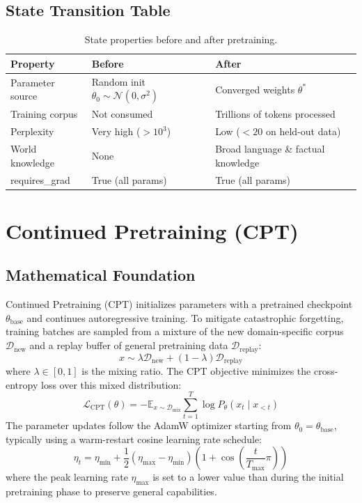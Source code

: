 \subsection{State Transition Table}
\begin{table}[h]\centering
\begin{tabular}{lll}\toprule
\textbf{Property} & \textbf{Before} & \textbf{After}\\\midrule
Parameter source & Random init $\theta_0 \sim \mathcal{N}(0,\sigma^2)$ & Converged weights $\theta^*$\\
Training corpus & Not consumed & Trillions of tokens processed\\
Perplexity & Very high ($>10^3$) & Low ($<20$ on held-out data)\\
World knowledge & None & Broad language \& factual knowledge\\
requires\_grad & True (all params) & True (all params)\\\bottomrule
\end{tabular}
\caption{State properties before and after pretraining.}
\end{table}

\newpage
\section{Continued Pretraining (CPT)}

\subsection{Mathematical Foundation}
Continued Pretraining (CPT) initializes parameters with a pretrained checkpoint $\theta_{\text{base}}$ and continues autoregressive training. To mitigate catastrophic forgetting, training batches are sampled from a mixture of the new domain-specific corpus $\mathcal{D}_{\text{new}}$ and a replay buffer of general pretraining data $\mathcal{D}_{\text{replay}}$:
\begin{equation}
  x \sim \lambda \mathcal{D}_{\text{new}} + (1 - \lambda) \mathcal{D}_{\text{replay}}
\end{equation}
where $\lambda \in [0,1]$ is the mixing ratio. The CPT objective minimizes the cross-entropy loss over this mixed distribution:
\begin{equation}
  \mathcal{L}_{\text{CPT}}(\theta) = -\mathbb{E}_{x \sim \mathcal{D}_{\text{mix}}} \sum_{t=1}^T \log P_\theta(x_t \mid x_{<t})
\end{equation}
The parameter updates follow the AdamW optimizer starting from $\theta_0 = \theta_{\text{base}}$, typically using a warm-restart cosine learning rate schedule:
\begin{equation}
  \eta_t = \eta_{\text{min}} + \frac{1}{2}(\eta_{\text{max}} - \eta_{\text{min}})\left(1 + \cos\left(\frac{t}{T_{\text{max}}}\pi\right)\right)
\end{equation}
where the peak learning rate $\eta_{\text{max}}$ is set to a lower value than during the initial pretraining phase to preserve general capabilities.

